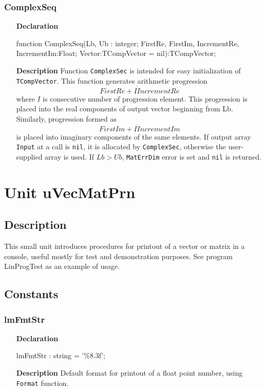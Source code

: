 \documentclass[12pt,a4paper,oneside]{report}
\newcommand{\lmath}[1]{   %
	\marginpar{\vspace{#1} 
		\begin{flushright}
			LMath
	\end{flushright} }
}
\newcommand{\declarationitem}[1]{\textbf{#1}}
\newcommand{\descriptiontitle}[1]{\textbf{#1}}
\newcommand{\code}[1]{\texttt{#1}}
\begin{document}
\subsubsection{ComplexSeq}
\label{complexseq}
\begin{itemize}
	\item[\declarationitem{Declaration}\hfill]
	\begin{flushleft}
function ComplexSeq(Lb, Ub : integer; FirstRe, FirstIm, IncrementRe, IncrementIm:Float; Vector:TCompVector = nil):TCompVector;		
	\end{flushleft}
	\item[\descriptiontitle{Description}]
	Function \code{ComplexSec} is intended for easy initialization of \code{TCompVector}. This function generates arithmetic progression 
	$$FirstRe+I \dot IncrementRe$$ where $I$ is consecutive number of progression element. This progression is placed into the real components of output vector beginning from Lb. Similarly, progression formed as $$FirstIm+I \dot IncrementIm$$ is placed into imaginary components of the same elements. If output array \code{Input} at a call is \code{nil}, it is allocated by \code{ComplexSec}, otherwise the user-supplied array is used.  If $Lb > Ub$, \code{MatErrDim} error is set and \code{nil} is returned.  
\end{itemize}	

\section{Unit uVecMatPrn}\lmath{-28pt}
\label{uvecmatprn}
\subsection{Description}
This small unit introduces procedures for printout of a vector or matrix in a console, useful mostly for test and demonstration purposes. See program LinProgTest as an example of usage.
\subsection{Constants}
\subsubsection{lmFmtStr}
\label{uvecmatprn:lmFmtStr}
\begin{itemize}
	\item[\declarationitem{Declaration}\hfill]
	\begin{flushleft}
	lmFmtStr : string = '\%8.3f';
	\end{flushleft}
	\item[\descriptiontitle{Description}\hfill]
	Default format for printout of a float point number, using \code{Format} function.
\end{itemize}
\end{document}
